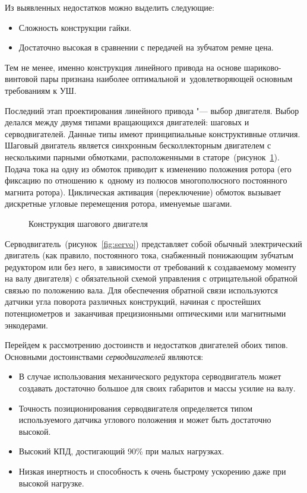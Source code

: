 Из выявленных недостатков можно выделить следующие:

\begin{itemize}
	\item Сложность конструкции гайки.
	\item Достаточно высокая в сравнении с передачей на зубчатом ремне цена.
\end{itemize}

Тем не менее, именно конструкция линейного привода на основе шариково-винтовой пары признана наиболее оптимальной и~удовлетворяющей основным требованиям к УШ. 

Последний этап проектирования линейного привода "--- выбор двигателя. Выбор делался между двумя типами вращающихся двигателей: шаговых и серводвигателей. Данные типы имеют принципиальные конструктивные отличия. Шаговый двигатель является синхронным бесколлекторным двигателем с несколькими парными обмотками, расположенными в статоре~(рисунок~\cref{fig:stepper}). Подача тока на одну из обмоток приводит к изменению положения ротора (его фиксацию по отношению к~одному из полюсов многополюсного постоянного магнита ротора). Циклическая активация (переключение) обмоток вызывает дискретные угловые перемещения ротора, именуемые шагами.

\begin{figure}[ht]
	\caption{Конструкция шагового двигателя}\label{fig:stepper}
\end{figure}

Серводвигатель~(рисунок~\cref{fig:servo}) представляет собой обычный электрический двигатель (как правило, постоянного тока, снабженный понижающим зубчатым редуктором или без него, в зависимости от требований к создаваемому моменту на валу двигателя) с обязательной схемой управления с отрицательной обратной связью по положению вала. Для обеспечения обратной связи используются датчики угла поворота различных конструкций, начиная с простейших потенциометров и~заканчивая прецизионными оптическими или магнитными энкодерами.

Перейдем к рассмотрению достоинств и недостатков двигателей обоих типов. Основными достоинствами \textit{серводвигателей} являются:

\begin{itemize}
	\item В случае использования механического редуктора серводвигатель может создавать достаточно большое для своих габаритов и массы усилие на валу.
	\item Точность позиционирования серводвигателя определяется типом используемого датчика углового положения и может быть достаточно высокой.
	\item Высокий КПД, достигающий 90\% при малых нагрузках.
	\item Низкая инертность и способность к очень быстрому ускорению даже при высокой нагрузке.	
\end{itemize}

